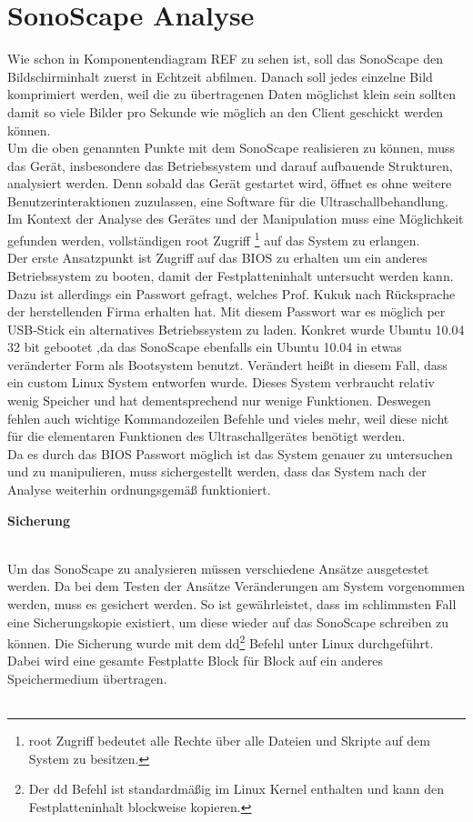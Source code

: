 \chapter{SonoScape Analyse}
Wie schon in Komponentendiagram REF zu sehen ist, soll das SonoScape den Bildschirminhalt zuerst in Echtzeit abfilmen. Danach soll jedes einzelne Bild komprimiert werden, weil die zu übertragenen Daten möglichst klein sein sollten damit so viele Bilder pro Sekunde wie möglich an den Client geschickt werden können.\\
Um die oben genannten Punkte mit dem SonoScape realisieren zu können, muss das Gerät, insbesondere das Betriebssystem und darauf aufbauende Strukturen, analysiert werden. Denn sobald das Gerät gestartet wird, öffnet es ohne weitere  Benutzerinteraktionen zuzulassen, eine Software für die Ultraschallbehandlung. Im Kontext der Analyse des Gerätes und der Manipulation muss eine Möglichkeit gefunden werden, vollständigen root Zugriff \footnote{root Zugriff bedeutet alle Rechte über alle Dateien und Skripte auf dem System zu besitzen.} auf das System zu erlangen.\\ 
Der erste Ansatzpunkt ist Zugriff auf das BIOS zu erhalten um ein anderes Betriebssystem zu booten, damit der Festplatteninhalt untersucht werden kann. Dazu ist allerdings ein Passwort gefragt, welches Prof. Kukuk nach Rücksprache der herstellenden Firma erhalten hat. Mit diesem Passwort war es möglich per USB-Stick ein alternatives Betriebssystem zu laden. Konkret wurde Ubuntu 10.04 32 bit gebootet ,da das SonoScape ebenfalls ein Ubuntu 10.04 in etwas veränderter Form als Bootsystem benutzt. Verändert heißt in diesem Fall, dass ein custom Linux System entworfen wurde. Dieses System verbraucht relativ wenig Speicher und hat dementsprechend nur wenige Funktionen. Deswegen fehlen auch wichtige Kommandozeilen Befehle und vieles mehr, weil diese nicht für die elementaren Funktionen des Ultraschallgerätes benötigt werden.\\
Da es durch das BIOS Passwort möglich ist das System genauer zu untersuchen und zu manipulieren, muss sichergestellt werden, dass das System nach der Analyse weiterhin ordnungsgemäß funktioniert. 
\clearpage
\begin{large}
\textbf{Sicherung}\\\\
\end{large}
Um das SonoScape zu analysieren müssen verschiedene Ansätze ausgetestet werden. Da bei dem Testen der Ansätze Veränderungen am System vorgenommen werden, muss es gesichert werden. So ist gewährleistet, dass im schlimmsten Fall eine Sicherungskopie existiert, um diese wieder auf das SonoScape schreiben zu können. Die Sicherung wurde mit dem dd\footnote{Der dd Befehl ist standardmäßig im Linux Kernel enthalten und kann den Festplatteninhalt blockweise kopieren. } Befehl unter Linux durchgeführt. Dabei wird eine gesamte Festplatte Block für Block auf ein anderes Speichermedium übertragen.\\\\
